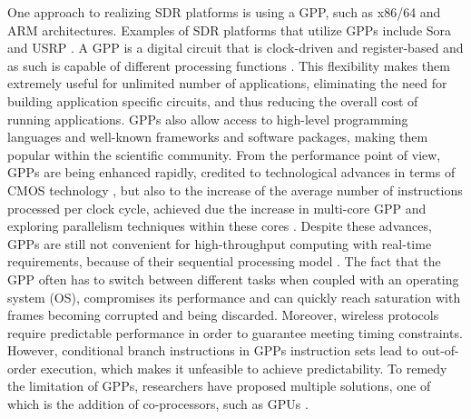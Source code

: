One approach to realizing SDR platforms is using a GPP, such as x86/64 and ARM architectures. Examples of SDR platforms that utilize GPPs include Sora \cite{tan2011a}  and USRP \cite{usrp_product_selector}. A GPP is a digital circuit that is clock-driven and register-based and as such is capable of different processing functions \cite{microprocessors_and_microcontrollers}. This flexibility makes them extremely useful for unlimited number of applications, eliminating the need for building application specific circuits, and thus reducing the overall cost of running applications. GPPs also allow access to high-level programming languages and well-known frameworks and software packages, making them popular within the scientific community. From the performance point of view, GPPs are being enhanced rapidly, credited to technological advances in terms of CMOS technology \cite{lin2014a}, but also to the increase of the average number of instructions processed per clock cycle, achieved due the increase in multi-core GPP and exploring parallelism techniques within these cores \cite{ulversoy2010a}. Despite these advances, GPPs are still not convenient for high-throughput computing with real-time requirements, because of their sequential processing model \cite{kamal2003a}. The fact that the GPP often has to switch between different tasks when coupled with an operating system (OS), compromises its performance and can quickly reach saturation with frames becoming corrupted and being discarded. Moreover, wireless protocols require predictable performance in order to guarantee meeting timing constraints. However, conditional branch instructions in GPPs instruction sets lead to out-of-order execution, which makes it unfeasible to achieve predictability. To remedy the limitation of GPPs, researchers have proposed multiple solutions, one of which is the addition of co-processors, such as GPUs \cite{vachhani2015a}.

